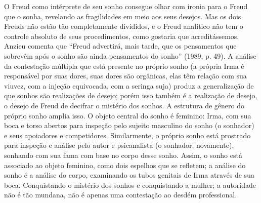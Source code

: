 O Freud como intérprete de seu sonho consegue olhar com ironia para o
Freud que o sonha, revelando as fragilidades em meio aos seus desejos.
Mas os dois Freuds não estão tão completamente divididos, e o Freud
analítico não tem o controle absoluto de seus procedimentos, como
gostaria que acreditássemos. Anzieu comenta que ``Freud
advertirá, mais tarde, que os pensamentos que sobrevêm após o sonho são
ainda pensamentos do sonho'' (1989, p. 49). A análise da contestação múltipla que está
presente no próprio sonho (a própria Irma é responsável por suas dores,
suas dores são orgânicas, elas têm relação com sua viuvez, com a injeção
equivocada, com a seringa suja) produz a generalização de que sonhos são
realizações de desejo; porém isso também é a realização de desejo, o
desejo de Freud de decifrar o mistério dos sonhos. A estrutura de gênero
do próprio sonho amplia isso. O objeto central do sonho é feminino:
Irma, com sua boca e torso abertos para inspeção pelo sujeito masculino
do sonho (o sonhador) e seus apoiadores e competidores. Similarmente, o
próprio sonho está prostrado para inspeção e análise pelo autor e
psicanalista (o sonhador, novamente), sonhando com sua fama com base no
corpo desse sonho. Assim, o sonho está associado ao objeto feminino,
como dois espelhos que se refletem; a análise do sonho é a análise do
corpo, examinando os tubos genitais de Irma através de sua boca.
Conquistando o mistério dos sonhos e conquistando a mulher; a autoridade
não é tão mundana, não é apenas uma contestação ao desdém professional.

